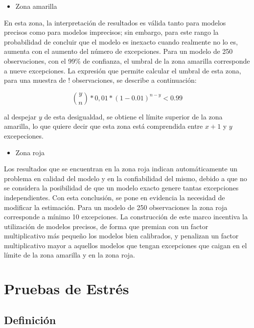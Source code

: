 \documentclass[
  12pt,
]{krantz}
\providecommand{\tightlist}{%
  \setlength{\itemsep}{0pt}\setlength{\parskip}{0pt}}
\begin{document}
\begin{itemize}
\tightlist
\item
  Zona amarilla
\end{itemize}

En esta zona, la interpretación de resultados es válida tanto para modelos precisos como para modelos imprecisos; sin embargo, para este rango la probabilidad de concluir que el modelo es inexacto cuando realmente no lo es, aumenta con el aumento del número de excepciones. Para un modelo de 250 observaciones, con el 99\% de confianza, el umbral de la zona amarilla corresponde a nueve excepciones. La expresión que permite calcular el umbral de esta zona, para una muestra de ! observaciones, se describe a continuación:

\[
\binom{y}{n} * 0,01*(1-0.01)^{n-y} < 0.99
\]

al despejar \(y\) de esta desigualdad, se obtiene el límite superior de la zona amarilla, lo que quiere decir que esta zona está comprendida entre \(x+1\) y \(y\) excepeciones.

\begin{itemize}
\tightlist
\item
  Zona roja
\end{itemize}

Los resultados que se encuentran en la zona roja indican automáticamente un problema en calidad del modelo y en la confiabilidad del mismo, debido a que no se considera la posibilidad de que un modelo exacto genere tantas excepciones independientes. Con esta conclusión, se pone en evidencia la necesidad de modificar la estimación. Para un modelo de 250 observaciones la zona roja corresponde a mínimo 10 excepciones.
La construcción de este marco incentiva la utilización de modelos precisos, de forma que premian con un factor multiplicativo más pequeño los modelos bien calibrados, y penalizan un factor multiplicativo mayor a aquellos modelos que tengan excepciones que caigan en el límite de la zona amarilla y en la zona roja.

\mainmatter

\hypertarget{pruebas-de-estres}{%
\chapter{Pruebas de Estrés}\label{pruebas-de-estres}}

\hypertarget{definicion-2}{%
\section{Definición}\label{definicion-2}}
\end{document}
